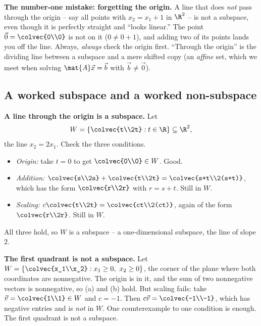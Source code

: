 \begin{trapbox}
\textbf{The number-one mistake: forgetting the origin.} A line that does \emph{not} pass
through the origin -- say all points with $x_2 = x_1 + 1$ in $\R^2$ -- is not a subspace,
even though it is perfectly straight and ``looks linear.'' The point
$\vec{0}=\colvec{0\\0}$ is not on it ($0 \ne 0 + 1$), and adding two of its points lands
you off the line. Always, \emph{always} check the origin first. ``Through the origin'' is
the dividing line between a subspace and a mere shifted copy (an \emph{affine} set, which
we meet when solving $\mat{A}\vec{x}=\vec{b}$ with $\vec{b}\ne\vec{0}$).
\end{trapbox}

\subsection{A worked subspace and a worked non-subspace}

\begin{example}\label{ch11:line-is-subspace}
\textbf{A line through the origin is a subspace.} Let
\[
W = \left\{ \colvec{t\\2t} : t\in\R \right\} \subseteq \R^2,
\]
the line $x_2 = 2x_1$. Check the three conditions.
\begin{itemize}
  \item \emph{Origin:} take $t=0$ to get $\colvec{0\\0}\in W$. Good.
  \item \emph{Addition:} $\colvec{s\\2s} + \colvec{t\\2t} = \colvec{s+t\\2(s+t)}$, which
  has the form $\colvec{r\\2r}$ with $r = s+t$. Still in $W$.
  \item \emph{Scaling:} $c\colvec{t\\2t} = \colvec{ct\\2(ct)}$, again of the form
  $\colvec{r\\2r}$. Still in $W$.
\end{itemize}
All three hold, so $W$ is a subspace -- a one-dimensional subspace, the line of slope $2$.
\end{example}

\begin{example}\label{ch11:not-subspace}
\textbf{The first quadrant is not a subspace.} Let
$W = \left\{\colvec{x_1\\x_2} : x_1\ge 0,\ x_2\ge 0\right\}$, the corner of the plane where
both coordinates are nonnegative. The origin is in it, and the sum of two nonnegative
vectors is nonnegative, so (a) and (b) hold. But scaling fails: take
$\vec{v}=\colvec{1\\1}\in W$ and $c=-1$. Then $c\vec{v} = \colvec{-1\\-1}$, which has
negative entries and is \emph{not} in $W$. One counterexample to one condition is enough.
The first quadrant is not a subspace.
\end{example}


